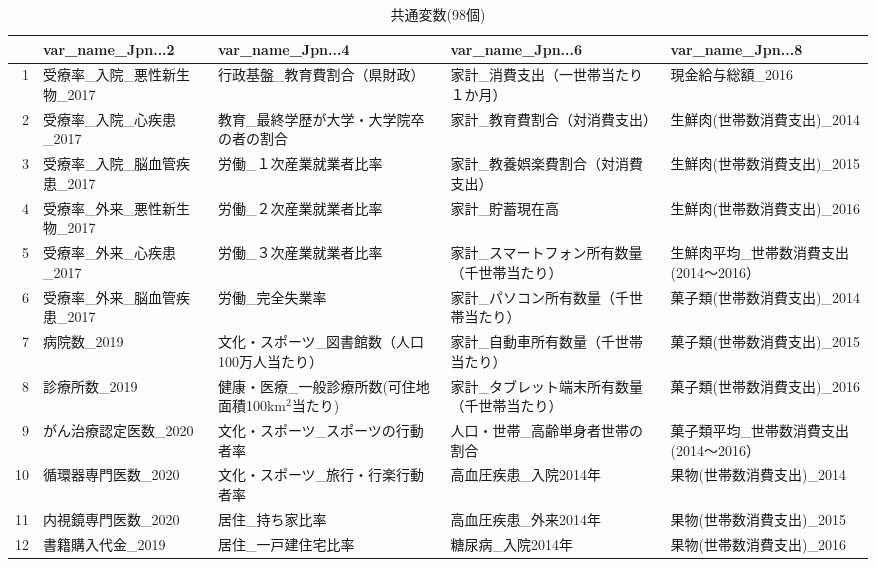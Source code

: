 \begin{table}[ht]
\centering
\caption{共通変数(98個)}
\label{table_commom_d.tex}
\begingroup\tiny

\begin{adjustbox}{width=1.5\textwidth}
\begin{tabular}{rllll}
  \hline
 & var\_name\_Jpn...2 & var\_name\_Jpn...4 & var\_name\_Jpn...6 & var\_name\_Jpn...8 \\
  \hline
1 & 受療率\_入院\_悪性新生物\_2017 & 行政基盤\_教育費割合（県財政） & 家計\_消費支出（一世帯当たり１か月） & 現金給与総額\_2016 \\
  2 & 受療率\_入院\_心疾患\_2017 & 教育\_最終学歴が大学・大学院卒の者の割合 & 家計\_教育費割合（対消費支出） & 生鮮肉(世帯数消費支出)\_2014 \\
  3 & 受療率\_入院\_脳血管疾患\_2017 & 労働\_１次産業就業者比率 & 家計\_教養娯楽費割合（対消費支出） & 生鮮肉(世帯数消費支出)\_2015 \\
  4 & 受療率\_外来\_悪性新生物\_2017 & 労働\_２次産業就業者比率 & 家計\_貯蓄現在高 & 生鮮肉(世帯数消費支出)\_2016 \\
  5 & 受療率\_外来\_心疾患\_2017 & 労働\_３次産業就業者比率 & 家計\_スマートフォン所有数量（千世帯当たり） & 生鮮肉平均\_世帯数消費支出(2014〜2016） \\
  6 & 受療率\_外来\_脳血管疾患\_2017 & 労働\_完全失業率 & 家計\_パソコン所有数量（千世帯当たり） & 菓子類(世帯数消費支出)\_2014 \\
  7 & 病院数\_2019 & 文化・スポーツ\_図書館数（人口100万人当たり） & 家計\_自動車所有数量（千世帯当たり） & 菓子類(世帯数消費支出)\_2015 \\
  8 & 診療所数\_2019 & 健康・医療\_一般診療所数(可住地面積100km$^2$当たり) & 家計\_タブレット端末所有数量（千世帯当たり） & 菓子類(世帯数消費支出)\_2016 \\
  9 & がん治療認定医数\_2020 & 文化・スポーツ\_スポーツの行動者率 & 人口・世帯\_高齢単身者世帯の割合 & 菓子類平均\_世帯数消費支出(2014〜2016） \\
  10 & 循環器専門医数\_2020 & 文化・スポーツ\_旅行・行楽行動者率 & 高血圧疾患\_入院2014年 & 果物(世帯数消費支出)\_2014 \\
  11 & 内視鏡専門医数\_2020 & 居住\_持ち家比率 & 高血圧疾患\_外来2014年 & 果物(世帯数消費支出)\_2015 \\
  12 & 書籍購入代金\_2019 & 居住\_一戸建住宅比率 & 糖尿病\_入院2014年 & 果物(世帯数消費支出)\_2016 \\

\end{tabular}
\end{adjustbox}
\end{table}
